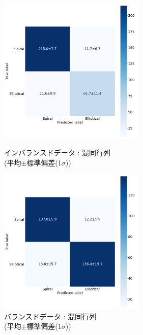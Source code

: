 \documentclass[a4j, 11pt]{jreport}
\begin{document}
\begin{figure}[H]
  \begin{minipage}[b]{0.45\hsize}
    \centering
    \includegraphics[keepaspectratio, width=7cm]{images/cm_mean_std_ex4-2.png}
    \caption{インバランスドデータ : 混同行列\\(平均$\pm$標準偏差(1$\sigma$))}
		\label{fig:cm_ex4-2-2}
  \end{minipage}
  \begin{minipage}[b]{0.45\hsize}
    \centering
    \includegraphics[keepaspectratio, width=7cm]{images/cm_mean_std_ex4-3.png}
    \caption{バランスドデータ : 混同行列\\(平均$\pm$標準偏差(1$\sigma$))}
		\label{fig:cm_ex4-3}
  \end{minipage}
\end{figure}


\end{document}
